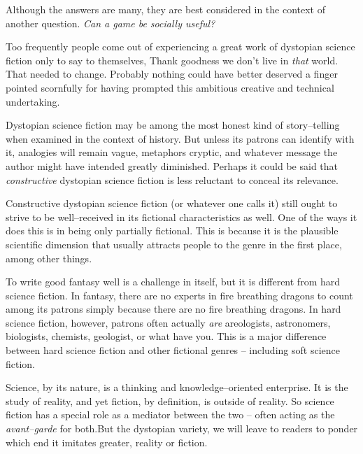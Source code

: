 

Although the answers are many, they are best considered in the context of another question. {\it Can a game be socially useful?}

Too frequently people come out of experiencing a great work of dystopian science fiction only to say to themselves, Thank goodness we don't live in {\it that} world. That needed to change. Probably nothing could have better deserved a finger pointed scornfully for having prompted this ambitious creative and technical undertaking.

Dystopian science fiction may be among the most honest kind of story--telling when examined in the context of history. But unless its patrons can identify with it, analogies will remain vague, metaphors cryptic, and whatever message the author might have intended greatly diminished. Perhaps it could be said that {\it constructive} dystopian science fiction is less reluctant to conceal its relevance.

    {}

Constructive dystopian science fiction (or whatever one calls it) still ought to strive to be well--received in its fictional characteristics as well. One of the ways it does this is in being only partially fictional. This is because it is the plausible scientific dimension that usually attracts people to the genre in the first place, among other things.

To write good fantasy well is a challenge in itself, but it is different from hard science fiction. In fantasy, there are no experts in fire breathing dragons to count among its patrons simply because there are no fire breathing dragons. In hard science fiction, however, patrons often actually {\it are} areologists, astronomers, biologists, chemists, geologist, or what have you. This is a major difference between hard science fiction and other fictional genres -- including soft science fiction. 

Science, by its nature, is a thinking and knowledge--oriented enterprise. It is the study of reality, and yet fiction, by definition, is outside of reality. So science fiction has a special role as a mediator between the two -- often acting as the {\it avant--garde} for both.\footnotecite[shedroff2012] But the dystopian variety, we will leave to readers to ponder which end it imitates greater, reality or fiction.

